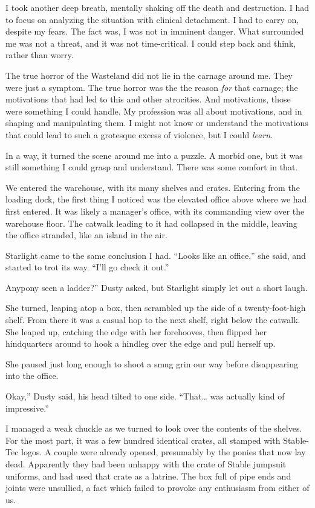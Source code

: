 I took another deep breath, mentally shaking off the death and destruction. I had to focus on analyzing the situation with clinical detachment. I had to carry on, despite my fears. The fact was, I was not in imminent danger. What surrounded me was not a threat, and it was not time-critical. I could step back and think, rather than worry.

The true horror of the Wasteland did not lie in the carnage around me. They were just a symptom. The true horror was the the reason \textit{for} that carnage; the motivations that had led to this and other atrocities. And motivations, those were something I could handle. My profession was all about motivations, and in shaping and manipulating them. I might not know or understand the motivations that could lead to such a grotesque excess of violence, but I could \textit{learn}.

In a way, it turned the scene around me into a puzzle. A morbid one, but it was still something I could grasp and understand. There was some comfort in that.

We entered the warehouse, with its many shelves and crates. Entering from the loading dock, the first thing I noticed was the elevated office above where we had first entered. It was likely a manager’s office, with its commanding view over the warehouse floor. The catwalk leading to it had collapsed in the middle, leaving the office stranded, like an island in the air.

Starlight came to the same conclusion I had. “Looks like an office,” she said, and started to trot its way. “I’ll go check it out.”

\leavevmode{}Anypony seen a ladder?” Dusty asked, but Starlight simply let out a short laugh.

She turned, leaping atop a box, then scrambled up the side of a twenty-foot-high shelf. From there it was a casual hop to the next shelf, right below the catwalk. She leaped up, catching the edge with her forehooves, then flipped her hindquarters around to hook a hindleg over the edge and pull herself up.

She paused just long enough to shoot a smug grin our way before disappearing into the office.

\leavevmode{}Okay,” Dusty said, his head tilted to one side. “That… was actually kind of impressive.”

I managed a weak chuckle as we turned to look over the contents of the shelves. For the most part, it was a few hundred identical crates, all stamped with Stable-Tec logos. A couple were already opened, presumably by the ponies that now lay dead. Apparently they had been unhappy with the crate of Stable jumpsuit uniforms, and had used that crate as a latrine. The box full of pipe ends and joints were unsullied, a fact which failed to provoke any enthusiasm from either of us.

